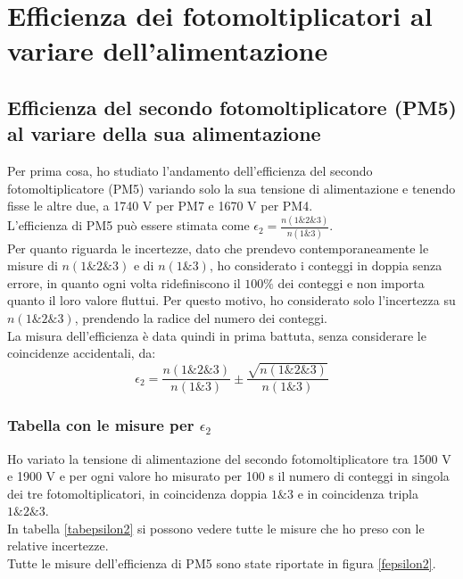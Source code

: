 \documentclass{article}
\begin{document}
\section{Efficienza dei fotomoltiplicatori al variare dell'alimentazione}

\subsection{Efficienza del secondo fotomoltiplicatore (PM5) al variare della sua alimentazione}
Per prima cosa, ho studiato l'andamento dell'efficienza del secondo fotomoltiplicatore (PM5) variando solo la sua tensione di alimentazione e tenendo fisse le altre due, a 1740 V per PM7 e 1670 V per PM4.
\\
L'efficienza di PM5 può essere stimata come $\epsilon_2 = \frac{n(1\&2\&3)}{n(1\&3)}$. \\ 
Per quanto riguarda le incertezze, dato che prendevo contemporaneamente le misure di $n(1\&2\&3)$ e di $n(1\&3)$, ho considerato i conteggi in doppia senza errore, in quanto ogni volta ridefiniscono il $100\%$ dei conteggi e non importa quanto il loro valore fluttui. 
Per questo motivo, ho considerato solo l'incertezza su $n(1\&2\&3)$, prendendo la radice del numero dei conteggi. \\
La misura dell'efficienza è data quindi in prima battuta, senza considerare le coincidenze accidentali, da: 
\begin{equation}
\epsilon_2 = \frac{n(1\&2\&3)}{n(1\&3)} \pm  \frac{\sqrt{n(1\&2\&3)}}{n(1\&3)}
\end{equation}

\subsubsection{Tabella con le misure per $\epsilon_2$}
Ho variato la tensione di alimentazione del secondo fotomoltiplicatore tra 1500 V e 1900 V e per ogni valore ho misurato per 100 s il numero di conteggi in singola dei tre fotomoltiplicatori, in coincidenza doppia $1\&3$ e in coincidenza tripla $1\&2\&3$.
\\
In tabella \ref{tabepsilon2} si possono vedere tutte le misure che ho preso con le relative incertezze. 
\\
Tutte le misure dell'efficienza di PM5 sono state riportate in figura \ref{fepsilon2}. 
\newpage
\end{document}
